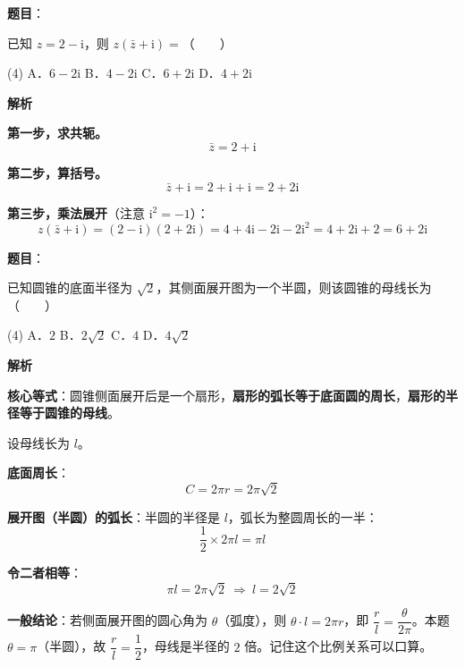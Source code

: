 \begin{answer}

\textbf{题目}：

已知 $z=2-\mathrm i$，则 $z(\bar z+\mathrm i)=$\mbox{（　　）}

\begin{gkopts}(4)
\task A．$6-2\mathrm i$
\task B．$4-2\mathrm i$
\task C．$6+2\mathrm i$
\task D．$4+2\mathrm i$
\end{gkopts}

\textbf{解析}

\textbf{第一步，求共轭。}
\nopagebreak[4]
\[\bar z=2+\mathrm i\]

\textbf{第二步，算括号。}
\nopagebreak[4]
\[\bar z+\mathrm i=2+\mathrm i+\mathrm i=2+2\mathrm i\]

\textbf{第三步，乘法展开}（注意 $\mathrm i^{2}=-1$）：
\nopagebreak[4]
\[z(\bar z+\mathrm i)=(2-\mathrm i)(2+2\mathrm i)=4+4\mathrm i-2\mathrm i-2\mathrm i^{2}=4+2\mathrm i+2=6+2\mathrm i\]


\par\medskip

\end{answer}
\begin{answer}

\textbf{题目}：

已知圆锥的底面半径为 $\sqrt2$，其侧面展开图为一个半圆，则该圆锥的母线长为\mbox{（　　）}

\begin{gkopts}(4)
\task A．$2$
\task B．$2\sqrt2$
\task C．$4$
\task D．$4\sqrt2$
\end{gkopts}

\textbf{解析}

\textbf{核心等式}：圆锥侧面展开后是一个扇形，\textbf{扇形的弧长等于底面圆的周长}，\textbf{扇形的半径等于圆锥的母线}。

设母线长为 $l$。

\textbf{底面周长}：
\nopagebreak[4]
\[C=2\pi r=2\pi\sqrt2\]

\textbf{展开图（半圆）的弧长}：半圆的半径是 $l$，弧长为整圆周长的一半：
\nopagebreak[4]
\[\frac12\times2\pi l=\pi l\]

\textbf{令二者相等}：
\nopagebreak[4]
\[\pi l=2\pi\sqrt2\ \Longrightarrow\ l=2\sqrt2\]

\begin{gktip}
\textbf{一般结论}：若侧面展开图的圆心角为 $\theta$（弧度），则 $\theta\cdot l=2\pi r$，即 $\dfrac rl=\dfrac\theta{2\pi}$。本题 $\theta=\pi$（半圆），故 $\dfrac rl=\dfrac12$，母线是半径的 $2$ 倍。记住这个比例关系可以口算。
\end{gktip}


\par\medskip

\end{answer}
